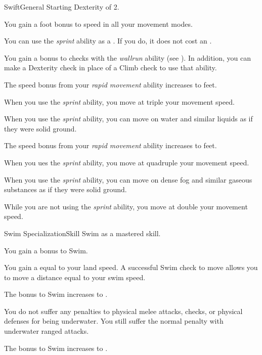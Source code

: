     \begin{feat}{Swift}{General}
        \featpre Starting Dexterity of 2.

         You gain a  foot bonus to speed in all your movement modes.

         You can use the \textit{sprint} ability as a .
        If you do, it does not cost an .

         You gain a  bonus to checks with the \textit{wallrun} ability (see ).
        In addition, you can make a Dexterity check in place of a Climb check to use that ability.

         The speed bonus from your \textit{rapid movement} ability increases to  feet.

         When you use the \textit{sprint} ability, you move at triple your movement speed.

         When you use the \textit{sprint} ability, you can move on water and similar liquids as if they were solid ground.

         The speed bonus from your \textit{rapid movement} ability increases to  feet.

         When you ues the \textit{sprint} ability, you move at quadruple your movement speed.

         When you use the \textit{sprint} ability, you can move on dense fog and similar gaseous substances as if they were solid ground.

         While you are not using the \textit{sprint} ability, you move at double your movement speed.
    \end{feat}

    \begin{feat}{Swim Specialization}{Skill}
        \featpre Swim as a mastered skill.

         You gain a  bonus to Swim.

        \ff[2]{}

         You gain a  equal to your land speed.
        A successful Swim check to move allows you to move a distance equal to your swim speed.

         The bonus to Swim increases to .

         You do not suffer any penalties to physical melee attacks, checks, or physical defenses for being underwater.
        You still suffer the normal penalty with underwater ranged attacks.

         The bonus to Swim increases to .
    \end{feat}

